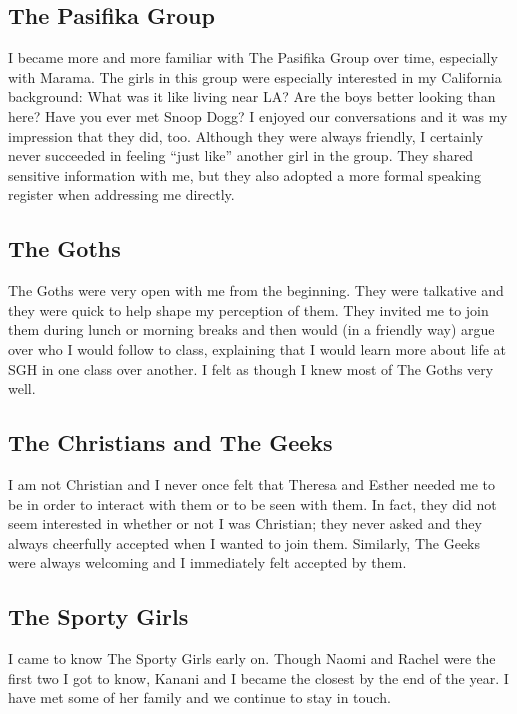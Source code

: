 \subsection{The Pasifika Group}
I became more and more familiar with The Pasifika Group over time, especially with Marama. The girls in this group were especially interested in my California background: What was it like living near LA?  Are the boys better looking than here?  Have you ever met Snoop Dogg?  I enjoyed our conversations and it was my impression that they did, too. Although they were always friendly, I certainly never succeeded in feeling ``just like'' another girl in the group. They shared sensitive information with me, but they also adopted a more formal speaking register when addressing me directly. 


\subsection{The Goths}
The Goths were very open with me from the beginning. They were talkative and they were quick to help shape my perception of them. They invited me to join them during lunch or morning breaks and then would (in a friendly way) argue over who I would follow to class, explaining that I would learn more about life at SGH in one class over another. I felt as though I knew most of The Goths very well.
 
\subsection{The Christians and The Geeks} 
I am not Christian and I never once felt that Theresa and Esther needed me to be in order to interact with them or to be seen with them. In fact, they did not seem interested in whether or not I was Christian; they never asked and they always cheerfully accepted when I wanted to join them. Similarly, The Geeks were always welcoming and I immediately felt accepted by them. 

\subsection{The Sporty Girls}
I came to know The Sporty Girls early on. Though Naomi and Rachel were the first two I got to know, Kanani and I became the closest by the end of the year. I have met some of her family and we continue to stay in touch.

